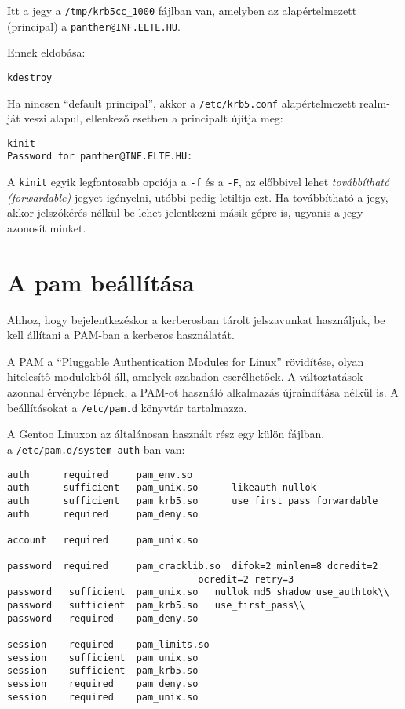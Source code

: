 Itt a jegy a \texttt{/tmp/krb5cc\_1000} fájlban van, amelyben az alapértelmezett (principal) a
\texttt{panther@INF.ELTE.HU}.

Ennek eldobása:

\begin{Verbatim}[frame=single]
kdestroy
\end{Verbatim}

Ha nincsen ``default principal'', akkor a \texttt{/etc/krb5.conf} alapértelmezett realm-ját veszi alapul, ellenkező
esetben a principalt újítja meg:

\begin{Verbatim}[frame=single,label=kinit]
kinit
Password for panther@INF.ELTE.HU:
\end{Verbatim}

A \texttt{kinit} egyik legfontosabb opciója a \texttt{-f} és a \texttt{-F}, az előbbivel lehet \emph{továbbítható
  (forwardable)} jegyet igényelni, utóbbi pedig letiltja ezt. Ha továbbítható a jegy, akkor jelszókérés nélkül be lehet
jelentkezni másik gépre is, ugyanis a jegy azonosít minket.


\section{A pam beállítása}
Ahhoz, hogy bejelentkezéskor a kerberosban tárolt jelszavunkat használjuk, be kell állítani a PAM-ban a kerberos
használatát.

A PAM a ``Pluggable Authentication Modules for Linux'' rövidítése, olyan hitelesítő modulokból áll, amelyek szabadon
cserélhetőek. A változtatások azonnal érvénybe lépnek, a PAM-ot használó alkalmazás újraindítása nélkül is. A
beállításokat a \texttt{/etc/pam.d} könyvtár tartalmazza.

A Gentoo Linuxon az általánosan használt rész egy külön fájlban,\\ a \texttt{/etc/pam.d/system-auth}-ban van:

\begin{Verbatim}[frame=single,label=system-auth]
auth      required     pam_env.so
auth      sufficient   pam_unix.so      likeauth nullok
auth      sufficient   pam_krb5.so      use_first_pass forwardable
auth      required     pam_deny.so

account   required     pam_unix.so

password  required     pam_cracklib.so  difok=2 minlen=8 dcredit=2
                                  ocredit=2 retry=3
password   sufficient  pam_unix.so   nullok md5 shadow use_authtok\\
password   sufficient  pam_krb5.so   use_first_pass\\
password   required    pam_deny.so  

session    required    pam_limits.so
session    sufficient  pam_unix.so
session    sufficient  pam_krb5.so
session    required    pam_deny.so
session    required    pam_unix.so
\end{Verbatim}

